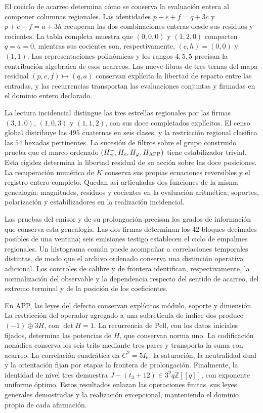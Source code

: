El cociclo de acarreo determina cómo se conserva la evaluación entera
al componer columnas regionales. Las identidades
\(p+e+f=q+3c\) y \(p+e-f=a+3h\) recuperan las dos combinaciones
enteras desde sus residuos y cocientes. La tabla completa muestra
que \((0,0,0)\) y \((1,2,0)\) comparten \(q=a=0\), mientras sus
cocientes son, respectivamente, \((c,h)=(0,0)\) y \((1,1)\).
Las representaciones polinómicas y los rangos \(4,5,5\) precisan
la contribución algebraica de esos acarreos. Las nueve fibras de tres
ternas del mapa residual \((p,e,f)\mapsto(q,a)\) conservan explícita
la libertad de reparto entre las entradas, y las recurrencias
transportan las evaluaciones conjuntas y firmadas en el dominio
entero declarado.

La lectura incidencial distingue las tres estrellas regionales por
las firmas \((3,1,0)\), \((1,0,3)\) y \((1,1,2)\), con sus doce
completados explícitos. El censo global distribuye las \(495\)
cuaternas en seis clases, y la restricción regional clasifica las
\(54\) hexadas pertinentes. La sucesión de filtros sobre el grupo
construido prueba que el marco ordenado
\((H^-_\alpha,H_e,H_\varphi,H_{\rm APP})\) tiene estabilizador
trivial. Esta rigidez determina la libertad residual de su acción
sobre las doce posiciones. La recuperación numérica de \(K\)
conserva sus propias ecuaciones reversibles y el registro entero
completo. Quedan así articuladas dos funciones de la misma
genealogía: magnitudes, residuos y cocientes en la evaluación
aritmética; soportes, polarización y estabilizadores en la
realización incidencial.


Las pruebas del emisor y de su prolongación precisan los grados de
información que conserva esta genealogía. Las dos firmas determinan los
\(42\) bloques decimales posibles de una ventana; seis emisiones testigo
establecen el ciclo de empalmes regionales. Un histograma común puede
acompañar a correlaciones temporales distintas, de modo que el archivo
ordenado conserva una distinción operativa adicional. Los controles de
calibre y de frontera identifican, respectivamente, la normalización del
observable y la dependencia respecto del sentido de acarreo, del extremo
terminal y de la posición de los coeficientes.

En APP, las leyes del defecto conservan explícitos módulo, soporte y
dimensión. La restricción del operador agregado a una subretícula de
índice dos produce \((-1)\oplus3H\), con \(\det H=1\). La recurrencia
de Pell, con los datos iniciales fijados, determina las potencias de
\(H\), que conservan norma uno. La codificación nonádica conserva
los seis trits mediante tres pares y transporta la suma con acarreo.
La correlación cuadrática da \(C^2=5I_6\); la saturación, la neutralidad
dual y la orientación fijan por etapas la frontera de prolongación.
Finalmente, la identidad de nivel tres demuestra
\(J-(t_3+12)\in3^9q\mathbb Z[[q]]\), con exponente uniforme óptimo.
Estos resultados enlazan las operaciones finitas, sus leyes generales
demostradas y la realización excepcional, manteniendo el dominio propio
de cada afirmación.

